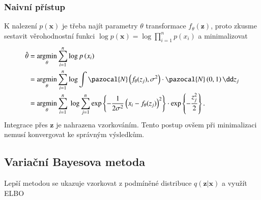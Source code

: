 \subsubsection{Naivní přístup}
K nalezení $p(\textbf{x})$ je třeba najít parametry $\theta$ transformace $f_{\theta}(\textbf{z})$, proto zkusme sestavit věrohodnostní funkci $ \log p\left( \textbf{x}\right) = \log \prod_{i = 1}^n p\left(x_i \right) $  a minimalizovat 
\begin{equation}
\begin{split}
\hat{\theta} & = \argmin_{\theta} \sum_{i=1}^n \log p\left(x_{i} \right)\\
& =  \argmin_{\theta} \sum_{i=1}^n \log \int \pazocal{N}\left(f_{\theta}(z_j),\sigma^2 \right)\cdot\pazocal{N}\left(0,1 \right)    \dd z_j \\
& = \argmin_{\theta} \sum_{i=1}^n \ \log\sum_{j=1}^n \exp \left\lbrace -\frac{1}{2\sigma^2} \left(x_i - f_{\theta}(z_j)  \right)^2 \right\rbrace \cdot \exp \left\lbrace -\frac{z_j^2}{2} \right\rbrace .
\end{split}
\end{equation}
Integrace přes $\textbf{z}$ je nahrazena vzorkováním. Tento postup ovšem při minimalizaci nemusí konvergovat ke správným výsledkům.
\subsection{Variační Bayesova metoda}
Lepší metodou se ukazuje vzorkovat z podmíněné distribuce $q(\textbf{z}\vert \textbf{x})$ a využít ELBO

